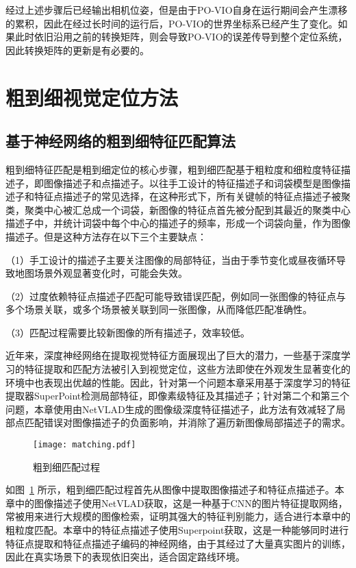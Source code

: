 经过上述步骤后已经输出相机位姿，但是由于PO-VIO自身在运行期间会产生漂移的累积，因此在经过长时间的运行后，PO-VIO的世界坐标系已经产生了变化。如果此时依旧沿用之前的转换矩阵，则会导致PO-VIO的误差传导到整个定位系统，因此转换矩阵的更新是有必要的。


\section{粗到细视觉定位方法}
\label{sec:c2f_loc}

\subsection{基于神经网络的粗到细特征匹配算法}

粗到细特征匹配是粗到细定位的核心步骤，粗到细匹配基于粗粒度和细粒度特征描述子，即图像描述子和点描述子。以往手工设计的特征描述子\cite{lowe2004distinctive, rublee2011orb}和词袋模型是图像描述子和特征点描述子的常见选择，在这种形式下，所有关键帧的特征点描述子被聚类，聚类中心被汇总成一个词袋，新图像的特征点首先被分配到其最近的聚类中心描述子中，并统计词袋中每个中心的描述子的频率，形成一个词袋向量，作为图像描述子。但是这种方法存在以下三个主要缺点：

（1）手工设计的描述子主要关注图像的局部特征，当由于季节变化或昼夜循环导致地图场景外观显著变化时，可能会失效。

（2）过度依赖特征点描述子匹配可能导致错误匹配，例如同一张图像的特征点与多个场景关联，或多个场景被关联到同一张图像，从而降低匹配准确性。

（3）匹配过程需要比较新图像的所有描述子，效率较低。

近年来，深度神经网络在提取视觉特征方面展现出了巨大的潜力，一些基于深度学习的特征提取和匹配方法\cite{detone2018superpoint, arandjelovic2016netvlad, sarlin2020superglue}被引入到视觉定位，这些方法即使在外观发生显著变化的环境中也表现出优越的性能。因此，针对第一个问题本章采用基于深度学习的特征提取器SuperPoint\cite{detone2018superpoint}检测局部特征，即像素级特征及其描述子；针对第二个和第三个问题，本章使用由NetVLAD\cite{arandjelovic2016netvlad}生成的图像级深度特征描述子，此方法有效减轻了局部点匹配错误对图像描述子的负面影响，并消除了遍历新图像局部描述子的需求。

\begin{figure}
  \centering
  \texttt{[image: matching.pdf]}
  \caption{粗到细匹配过程}
  \label{fig:matching}
\end{figure}

如图~\ref{fig:matching} 所示，粗到细匹配过程首先从图像中提取图像描述子和特征点描述子。本章中的图像描述子使用NetVLAD\cite{arandjelovic2016netvlad}获取，这是一种基于CNN的图片特征提取网络，常被用来进行大规模的图像检索，证明其强大的特征判别能力，适合进行本章中的粗粒度匹配。本章中的特征点描述子使用Superpoint\cite{detone2018superpoint}获取，这是一种能够同时进行特征点提取和特征点描述子编码的神经网络，由于其经过了大量真实图片的训练，因此在真实场景下的表现依旧突出，适合固定路线环境。

